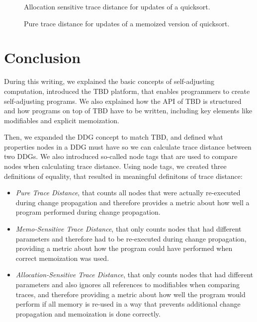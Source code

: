\begin{figure}
  \centering
  \caption[margin=5]{Allocation sensitive trace distance for updates of a quicksort.}
  \label{plot:quicksort_alloc}
\end{figure}

\begin{figure}
  \centering
  \caption[margin=5]{Pure trace distance for updates of a memoized version of quicksort.}
  \label{plot:memo_quicksort_pure}
\end{figure}

\chapter{Conclusion}

During this writing, we explained the basic concepts of self-adjusting computation, introduced the TBD platform, that enables programmers to create self-adjusting programs. We also explained how the API of TBD is structured and how programs on top of TBD have to be written, including key elements like modifiables and explicit memoization. 

Then, we expanded the DDG concept to match TBD, and defined what properties nodes in a DDG must have so we can calculate trace distance between two DDGs. We also introduced so-called node tags that are used to compare nodes when calculating trace distance. Using node tags, we created three definitions of equality, that resulted in meaningful definitons of trace distance: 

\begin{itemize}
\item \textit{Pure Trace Distance}, that counts all nodes that were actually re-executed during change propagation and therefore provides a metric about how well a program performed during change propagation. 
\item \textit{Memo-Sensitive Trace Distance}, that only counts nodes that had different parameters and therefore had to be re-executed during change propagation, providing a metric about how the program could have performed when correct memoization was used. 
\item \textit{Allocation-Sensitive Trace Distance}, that only counts nodes that had different parameters and also ignores all references to modifiables when comparing traces, and therefore providing a metric about how well the program would perform if all memory is re-used in a way that prevents additional change propagation and memoization is done correctly. 
\end{itemize} 


